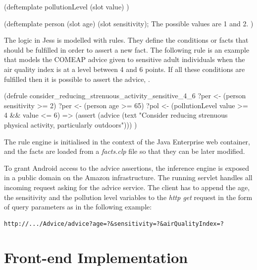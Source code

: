 {\centering
\begin{spverbatim}
(deftemplate pollutionLevel
    (slot value)
)

(deftemplate person
    (slot age)
    (slot sensitivity); The possible values are 1 and 2.
)
\end{spverbatim}
\par
}

The logic in Jess is modelled with rules. They define the conditions or facts that should be fulfilled in order to assert a new fact. The following rule is an example that models the COMEAP advice given to sensitive adult individuals when the air quality index is at a level between 4 and 6 points. If all these conditions are fulfilled then it is possible to assert the advice,  \cite{HealthProtectionAgencyfortheCommitteeontheMedicalEffectsofAirPollutants2011}. 

{\centering
\begin{spverbatim}
(defrule consider_reducing_strenuous_activity_sensitive_4_6
    ?per <- (person {sensitivity >= 2})
    ?per <- (person {age >= 65})
    ?pol <- (pollutionLevel {value >= 4 && value <= 6})
    =>
    (assert
        (advice (text "Consider reducing strenuous physical activity, particularly outdoors")))
)
\end{spverbatim}
\par
}
The rule engine is initialised in the context of the Java Enterprise web container, and the facts are loaded from a \textit{facts.clp} file so that they can be later modified. 

To grant Android access to the advice assertions, the inference engine is exposed in a public domain on the Amazon infrastructure. The running servlet handles all incoming  request asking for the advice service. The client has to append the age, the sensitivity and the pollution level variables to the \textit{http get} request in the form of query parameters as in the following example: \bigskip

{\centering
\begin{BVerbatim}
http://.../Advice/advice?age=?&sensitivity=?&airQualityIndex=?
\end{BVerbatim}
\par
}

\section{Front-end Implementation}
